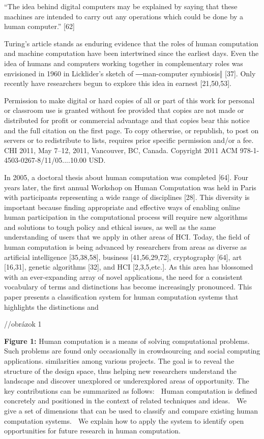 \documentclass{acm_proc_article-sp} %
\begin{document}
“The idea behind digital computers may be explained by saying that these machines are intended to carry out any operations which could be done by a human computer.” [62] 

Turing’s article stands as enduring evidence that the roles of human computation and machine computation have been intertwined since the earliest days. Even the idea of humans and computers working together in complementary roles was envisioned in 1960 in Licklider’s sketch of ―man-computer symbiosis‖ [37]. Only recently have researchers begun to explore this idea in earnest [21,50,53]. 

Permission to make digital or hard copies of all or part of this work for personal or classroom use is granted without fee provided that copies are not made or distributed for profit or commercial advantage and that copies bear this notice and the full citation on the first page. To copy otherwise, or republish, to post on servers or to redistribute to lists, requires prior specific permission and/or a fee. CHI 2011, May 7–12, 2011, Vancouver, BC, Canada. Copyright 2011 ACM  978-1-4503-0267-8/11/05....10.00 USD. 

In 2005, a doctoral thesis about human computation was completed [64]. Four years later, the first annual Workshop on Human Computation was held in Paris with participants representing a wide range of disciplines [28]. This diversity is important because finding appropriate and effective ways of enabling online human participation in the computational process will require new algorithms and solutions to tough policy and ethical issues, as well as the same understanding of users that we apply in other areas of HCI. Today, the field of human computation is being advanced by researchers from areas as diverse as artificial intelligence [35,38,58], business [41,56,29,72], cryptography [64], art [16,31], genetic algorithms [32], and HCI [2,3,5,etc.]. As this area has blossomed with an ever-expanding array of novel applications, the need for a consistent vocabulary of terms and distinctions has become increasingly pronounced. This paper presents a classification system for human computation systems that highlights the distinctions and 

//obrázok 1

\textbf{Figure 1:}
Human computation is a means of solving computational problems. Such problems are found only occasionally in crowdsourcing and social computing applications. similarities among various projects. The goal is to reveal the structure of the design space, thus helping new researchers understand the landscape and discover unexplored or underexplored areas of opportunity. The key contributions can be summarized as follows:  Human computation is defined concretely and positioned in the context of related techniques and ideas.  We give a set of dimensions that can be used to classify and compare existing human computation systems.  We explain how to apply the system to identify open opportunities for future research in human computation. 
\end{document}
